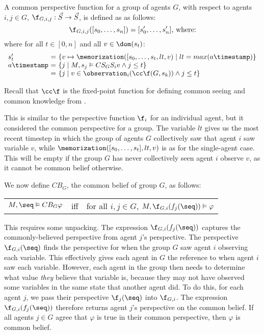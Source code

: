 \begin{definition}
    
    \label{def:common-perspective-function}
    A common perspective function for a group of agents $G$, with respect to agents $i,j \in G$, $\f_{G,i,j}: \vec{S} \rightarrow \vec{S}$, is defined as as follows:
    \[
    \f_{G,i,j}([s_0,\dots,s_n])=[s'_0,\dots,s'_n] \text{, where:}
    \]
\noindent
    where for all $t \in [0, n]$ and all $v \in \dom(s_t)$:
    \[
    \begin{array}{l@{\ }l@{\ }l}    
    s'_t & = & \{v \mapsto \memorization([s_0,\dots,s_t, lt,v) \mid lt = max(a\timestamp)\}\\
    a\timestamp & = & \{j \mid M, s_j \vDash CS_G S_i v \land j \leq t \}\\
                & = & \{j \mid v \in \observation_i(\cc\f(G, s_k)) \land j \leq t\}
    \end{array}
    \]

Recall that $\cc\f$ is the fixed-point function for defining common seeing and common knowledge from \citet{Hu2022-ul}.

This is similar to the perspective function $\f_i$ for an individual agent, but it considered the common perspective for a group. The variable $lt$ gives us the most recent timestep in which the group of agents $G$ collectively saw that agent $i$ saw variable $v$, while $\memorization([s_0,\dots,s_t],lt,v)$ is as for the single-agent case. This will be empty if the group $G$ has never collectively seen agent $i$ observe $v$, as it cannot be common belief otherwise.
\end{definition}

We now define $CB_G$, the common belief of group $G$, as follows:

\vspace{2mm}
\noindent
\begin{tabular}{lll}
  $M, \seq \vDash CB_G \varphi$ & iff & for all $i,j \in G$, $M, \f_{G,i}(f_j(\seq)) \vDash \varphi$
\end{tabular}
\vspace{2mm}

This requires some unpacking. The expression $\f_{G,i}(f_j(\seq))$ captures the commonly-believed perspective from agent $j$'s perspective. The perspective $\f_{G,i}(\seq)$ finds the perspective for when the group $G$ saw agent $i$ observing each variable. This effectively gives each agent in $G$ the reference to when agent $i$ saw each variable. However, each agent in the group then needs to determine what value \emph{they} believe that variable is, because they may not have observed some variables in the same state that another agent did. To do this, for each agent $j$, we pass their perspective $\f_j(\seq)$ into $\f_{G,i}$. The expression $\f_{G,i}(f_j(\seq))$ therefore returns agent $j$'s perspective on the common belief. If all agents $j \in G$ agree that $\varphi$ is true in their common perspective, then $\varphi$ is common belief.

